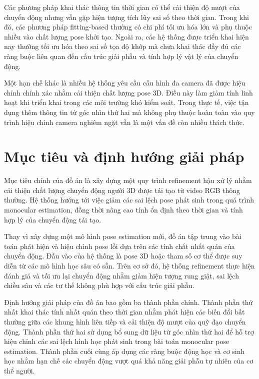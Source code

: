 \documentclass[../DoAn.tex]{subfiles}
\begin{document}
Các phương pháp khai thác thông tin thời gian có thể cải thiện độ mượt của chuyển động nhưng vẫn gặp hiện tượng tích lũy sai số theo thời gian. Trong khi đó, các phương pháp fitting-based thường có chi phí tối ưu hóa lớn và phụ thuộc nhiều vào chất lượng pose khởi tạo. Ngoài ra, các hệ thống được triển khai hiện nay thường tối ưu hóa theo sai số tọa độ khớp mà chưa khai thác đầy đủ các ràng buộc liên quan đến cấu trúc giải phẫu và tính hợp lý vật lý của chuyển động.

Một hạn chế khác là nhiều hệ thống yêu cầu cấu hình đa camera đã được hiệu chỉnh chính xác nhằm cải thiện chất lượng pose 3D. Điều này làm giảm tính linh hoạt khi triển khai trong các môi trường khó kiểm soát. Trong thực tế, việc tận dụng thêm thông tin từ góc nhìn thứ hai mà không phụ thuộc hoàn toàn vào quy trình hiệu chỉnh camera nghiêm ngặt vẫn là một vấn đề còn nhiều thách thức.

\section{Mục tiêu và định hướng giải pháp}

Mục tiêu chính của đồ án là xây dựng một quy trình refinement hậu xử lý nhằm cải thiện chất lượng chuyển động người 3D được tái tạo từ video RGB thông thường. Hệ thống hướng tới việc giảm các sai lệch pose phát sinh trong quá trình monocular estimation, đồng thời nâng cao tính ổn định theo thời gian và tính hợp lý của chuyển động tái tạo.

Thay vì xây dựng một mô hình pose estimation mới, đồ án tập trung vào bài toán phát hiện và hiệu chỉnh pose lỗi dựa trên các tính chất nhất quán của chuyển động. Đầu vào của hệ thống là pose 3D hoặc tham số cơ thể được suy diễn từ các mô hình học sâu có sẵn. Trên cơ sở đó, hệ thống refinement thực hiện đánh giá và tối ưu lại chuyển động nhằm giảm hiện tượng rung giật, sai lệch chiều sâu và các tư thế không phù hợp với cấu trúc giải phẫu.

Định hướng giải pháp của đồ án bao gồm ba thành phần chính. Thành phần thứ nhất khai thác tính nhất quán theo thời gian nhằm phát hiện các biến đổi bất thường giữa các khung hình liên tiếp và cải thiện độ mượt của quỹ đạo chuyển động. Thành phần thứ hai sử dụng bổ sung dữ liệu từ góc nhìn thứ hai để hỗ trợ hiệu chỉnh các sai lệch hình học phát sinh trong bài toán monocular pose estimation. Thành phần cuối cùng áp dụng các ràng buộc động học và cơ sinh học nhằm hạn chế các chuyển động vượt quá khả năng giải phẫu tự nhiên của cơ thể người.
\end{document}
